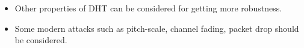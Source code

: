 \documentclass[12pt,a4paper]{report}
\begin{document}
\begin{itemize}
\item Other properties of DHT can be considered for getting more robustness.

\item Some modern attacks such as pitch-scale, channel fading, packet drop should be considered.
\end{itemize}




%

%
%
%
%
%
%
%
%
%
%
%
%
%
%
%
%
\end{document}
